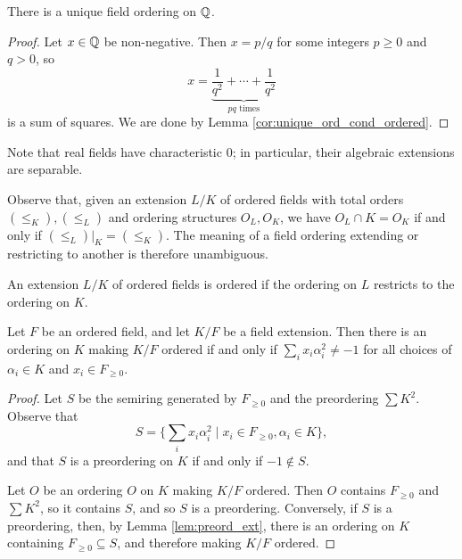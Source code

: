 \begin{corollary}
  \label{cor:unique_ord_Q}
  \leanok
  There is a unique field ordering on $\mathbb{Q}$.
\end{corollary}
\begin{proof}
  \leanok
  Let $x\in\mathbb{Q}$ be non-negative. Then $x=p/q$ for some integers $p\geq0$ and $q>0$, so 
  \[x=\underbrace{\frac{1}{q^2}+\cdots+\frac{1}{q^2}}_{pq\text{ times}}\]
  is a sum of squares. We are done by Lemma \ref{cor:unique_ord_cond_ordered}.
\end{proof}

Note that real fields have characteristic 0; in particular, their algebraic extensions are separable.

Observe that, given an extension $L/K$ of ordered fields with total orders $(\leq_K),(\leq_L)$ and ordering structures $O_L,O_K$, we have $O_L\cap K=O_K$ if and only if $(\leq_L)|_K=(\leq_K)$. The meaning of a field ordering extending or restricting to another is therefore unambiguous.

\begin{definition}
  \label{def:ordered_ext}
  \leanok
  An extension $L/K$ of ordered fields is ordered if the ordering on $L$ restricts to the ordering on $K$.
\end{definition}

\begin{lemma}
  \label{lem:ext_ord_cond}
  \leanok
  Let $F$ be an ordered field, and let $K/F$ be a field extension. Then there is an ordering on $K$ making $K/F$ ordered if and only if $\sum_i x_i\alpha_i^2\neq-1$ for all choices of $\alpha_i\in K$ and $x_i\in F_{\geq0}$.
\end{lemma}
\begin{proof}
  \leanok
  Let $S$ be the semiring generated by $F_{\geq0}$ and the preordering $\sum K^2$. Observe that
  \[S=\{\sum_i x_i\alpha_i^2\mid x_i\in F_{\geq0},\alpha_i\in K\},\]
  and that $S$ is a preordering on $K$ if and only if $-1\notin S$.

  Let $O$ be an ordering $O$ on $K$ making $K/F$ ordered. Then $O$ contains $F_{\geq0}$ and $\sum K^2$, so it contains $S$, and so $S$ is a preordering. Conversely, if $S$ is a preordering, then, by Lemma \ref{lem:preord_ext}, there is an ordering on $K$ containing $F_{\geq0}\subseteq S$, and therefore making $K/F$ ordered.
\end{proof}

